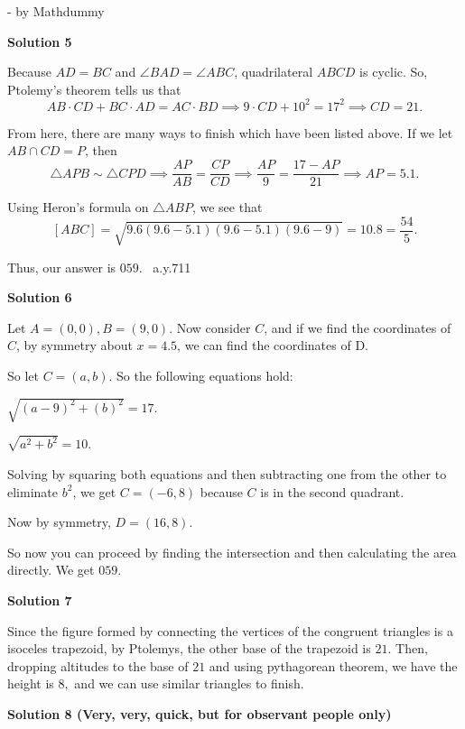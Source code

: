 \begin{enumerate}
 - by Mathdummy

 



\textbf{Solution 5}

Because $AD = BC$ and $\angle BAD = \angle ABC$, quadrilateral $ABCD$ is cyclic. So, Ptolemy's theorem tells us that
 \[AB \cdot CD + BC \cdot AD = AC \cdot BD \implies 9 \cdot CD + 10^2 = 17^2 \implies CD = 21.\]

 From here, there are many ways to finish which have been listed above. If we let $AB \cap CD = P$, then 
 \[\triangle APB \sim \triangle CPD \implies \frac{AP}{AB} = \frac{CP}{CD} \implies \frac{AP}{9} = \frac{17-AP}{21} \implies AP = 5.1.\]

 Using Heron's formula on $\triangle ABP$, we see that 
 \[[ABC] = \sqrt{9.6(9.6-5.1)(9.6-5.1)(9.6-9)} = 10.8 = \frac{54}{5}.\]

 Thus, our answer is $059$. ~a.y.711

 



\textbf{Solution 6}

Let $A=(0,0), B=(9,0)$. Now consider $C$, and if we find the coordinates of $C$, by symmetry about $x=4.5$, we can find the coordinates of D. 

 So let $C=(a,b)$. So the following equations hold:

 $\sqrt{(a-9)^2+(b)^2}=17$.

 $\sqrt{a^2+b^2}=10$.

 Solving by squaring both equations and then subtracting one from the other to eliminate $b^2$, we get $C=(-6,8)$ because $C$ is in the second quadrant.

 Now by symmetry, $D=(16, 8)$.

 So now you can proceed by finding the intersection and then calculating the area directly. We get $\boxed{059}$.

 



\textbf{Solution 7}

Since the figure formed by connecting the vertices of the congruent triangles is a isoceles trapezoid, by Ptolemys, the other base of the trapezoid is $21.$ Then, dropping altitudes to the base of $21$ and using pythagorean theorem, we have the height is $8,$ and we can use similar triangles to finish.

 



\textbf{Solution 8 (Very, very, quick, but for observant people only)}



\end{enumerate}
